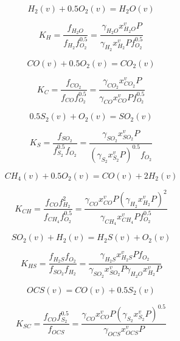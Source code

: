 \documentclass[draft, english]{volcanica-template}
\begin{document}
\begin{equation}
    H_2(v) + 0.5O_2(v) = H_2O(v)
\end{equation}

\begin{equation}
    K_H = \frac{f_{H_2O}}{f_{H_2}f^{0.5}_{O_2}}=\frac{\gamma_{H_2O}x^v_{H_2O}P}{\gamma_{H_2}x^v_{H_2}Pf^{0.5}_{O_2}}
\end{equation}

\begin{equation}
    CO(v) + 0.5O_2(v) = CO_2(v)
\end{equation}

\begin{equation}
    K_C = \frac{f_{CO_2}}{f_{CO}f^{0.5}_{O_2}}=\frac{\gamma_{CO_2}x^v_{CO_2}P}{\gamma_{CO}x^v_{CO}Pf^{0.5}_{O_2}}
\end{equation}

\begin{equation}
    0.5S_2(v) + O_2(v) = SO_2(v)
\end{equation}

\begin{equation}
    K_S = \frac{f_{SO_2}}{f_{S_2}^{0.5}f_{O_2}}=\frac{\gamma_{SO_2}x^v_{SO_2}P}{\left ( \gamma_{S_2}x^v_{S_2}P \right )^{0.5} f_{O_2}}
\end{equation}

\begin{equation}
    CH_4(v) + 0.5O_2(v) = CO(v) + 2H_2(v)
\end{equation}

\begin{equation}
    K_{CH} = \frac{f_{CO}f^2_{H_2}}{f_{CH_4}f^{0.5}_{O_2}}=\frac{\gamma_{CO}x^v_{CO}P \left ( \gamma_{H_2}x^v_{H_2}P \right )^2}{\gamma_{CH_4}x^v_{CH_4}Pf^{0.5}_{O_2}}
\end{equation}

\begin{equation}
    SO_2(v) + H_2(v) = H_2S(v) + O_2(v)
\end{equation}

\begin{equation}
    K_{HS} = \frac{f_{H_2S}f_{O_2}}{f_{SO_2}f_{H_2}}=\frac{\gamma_{H_2S}x^v_{H_2S}Pf_{O_2}}{\gamma_{SO_2}x^v_{SO_2}P \gamma_{H_2O}x^v_{H_2}P}
\end{equation}

\begin{equation}
    OCS(v) = CO(v) + 0.5S_2(v)
\end{equation}

\begin{equation}
    K_{SC} = \frac{f_{CO}f^{0.5}_{S_2}}{f_{OCS}}=\frac{\gamma_{CO}x^v_{CO}P \left ( \gamma_{S_2}x^v_{S_2}P \right )^{0.5}}{\gamma_{OCS}x^v_{OCS}P}
\end{equation}
\end{document}
